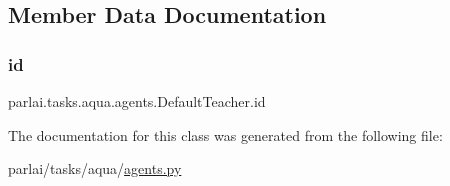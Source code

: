 \subsection{Member Data Documentation}
\mbox{\label{classparlai_1_1tasks_1_1aqua_1_1agents_1_1DefaultTeacher_a7f24ae016e64a6b1b6c091598b204897}} 
\subsubsection{\texorpdfstring{id}{id}}
{\footnotesize\ttfamily parlai.\+tasks.\+aqua.\+agents.\+Default\+Teacher.\+id}



The documentation for this class was generated from the following file\+:\begin{DoxyCompactItemize}
\item 
parlai/tasks/aqua/\hyperlink{parlai_2tasks_2aqua_2agents_8py}{agents.\+py}\end{DoxyCompactItemize}
